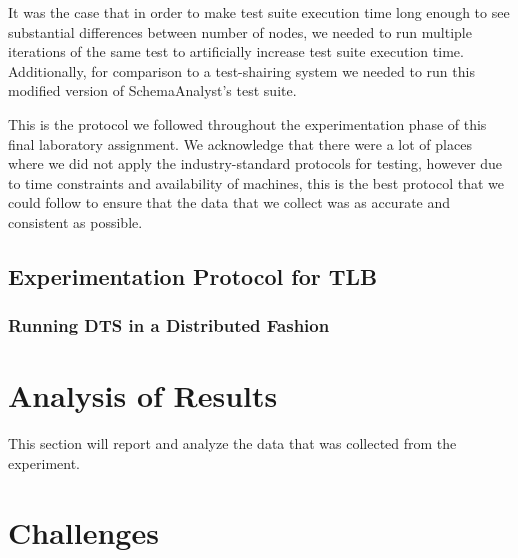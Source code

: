 \documentclass{article}
\begin{document}
{It was the case that in order to make test suite execution time long enough to see substantial differences between
number of nodes, we needed to run multiple iterations of the same test to artificially increase test suite execution
time. Additionally, for comparison to a test-shairing system we needed to run this modified version of SchemaAnalyst's
test suite.

This is the protocol we followed throughout the experimentation phase of this final laboratory assignment. We acknowledge that
there were a lot of places where we did not apply the industry-standard protocols for testing, however due to time constraints
and availability of machines, this is the best protocol that we could follow to ensure that the data that we collect
was as accurate and consistent as possible.

\subsection{Experimentation Protocol for TLB}
\subsubsection{Running DTS in a Distributed Fashion}

\section{Analysis of Results}
\label{analysis}

This section will report and analyze the data that was collected from the experiment.

\section{Challenges}
\label{challenges}

}
\end{document}
